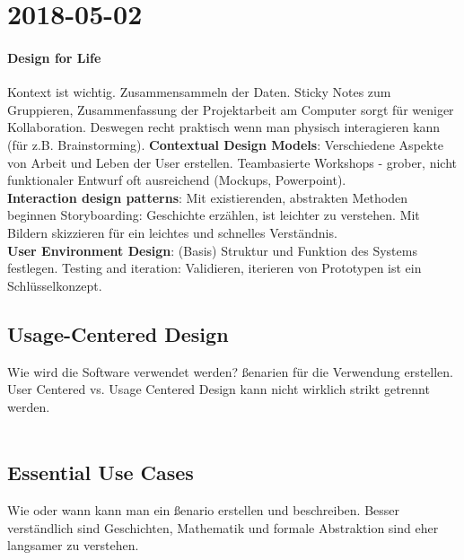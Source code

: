 \section{2018-05-02}

\paragraph{Design for Life}

Kontext ist wichtig.
Zusammensammeln der Daten.
Sticky Notes zum Gruppieren, Zusammenfassung der Projektarbeit am Computer sorgt
für weniger Kollaboration. 
Deswegen recht praktisch wenn man physisch interagieren kann (für z.B. Brainstorming).
\textbf{Contextual Design Models}: Verschiedene Aspekte von Arbeit und Leben der User erstellen.
Teambasierte Workshops - grober, nicht funktionaler Entwurf oft ausreichend (Mockups, Powerpoint). \\
\textbf{Interaction design patterns}: Mit existierenden, abstrakten Methoden beginnen
Storyboarding: Geschichte erzählen, ist leichter zu verstehen. Mit Bildern skizzieren
für ein leichtes und schnelles Verständnis. \\
\textbf{User Environment Design}: (Basis) Struktur und Funktion des Systems festlegen.
Testing and iteration: Validieren, iterieren von Prototypen ist ein Schlüsselkonzept.\\

\subsection{Usage-Centered Design}
Wie wird die Software verwendet werden?
ßenarien für die Verwendung erstellen.
User Centered vs. Usage Centered Design kann nicht wirklich strikt getrennt werden. 
\\
\noindent{}
\\
\subsection{Essential Use Cases}
Wie oder wann kann man ein ßenario erstellen und beschreiben. 
Besser verständlich sind Geschichten, Mathematik und formale Abstraktion sind 
eher langsamer zu verstehen. 


